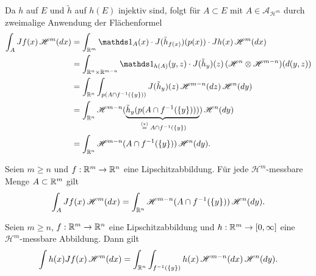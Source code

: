 \documentclass[a4paper,twoside,DIV15,BCOR12mm]{scrbook}
\newcommand{\A}{\mathcal A}
\newcommand{\ind}{\mathds 1}
\newcommand{\HM}{\mathscr H}
\begin{document}
\begin{beweis}
Da $h$ auf $E$ und $\tilde h$ auf $h(E)$ injektiv sind, folgt für $A\subset E$ mit $A\in\A_{\HM^m}$ durch zweimalige Anwendung der Flächenformel
\begin{align*}
\int_A Jf(x) \, \HM^m(dx) 
&= \int_{\MdR^m} \ind_A(x) \cdot J(\tilde h_{f(x)})(p(x)) \cdot J h(x)\, \HM^m(dx) \\
&= \int_{\MdR^n\times\MdR^{m-n}} \ind_{h(A)} (y,z) \cdot J(\tilde h_y)(z) \, (\HM^n\otimes \HM^{m-n})(d(y,z)) \\
&= \int_{\MdR^n} \int_{p(A\cap f^{-1}(\{y\}))} J(\tilde h_y)(z) \, \HM^{m-n}(dz)\, \HM^n(dy) \\
&= \int_{\MdR^n} \HM^{m-n}(\underbrace{\tilde h_y (p(A\cap f^{-1}(\{y\})))}_{\gleichwegen{(*)} A\cap f^{-1}(\{y\})}) \, \HM^n(dy) \\
&= \int_{\MdR^n} \HM^{m-n}(A\cap f^{-1}(\{y\}))\, \HM^n(dy).
\end{align*}
\end{beweis}

\begin{satz}
\label{satz:3.16}
Seien $m\ge n$ und $f:\mathbb{R}^m \to \mathbb{R}^n$ eine Lipschitzabbildung. Für jede $\HM^m$-messbare Menge $A\subset\mathbb{R}^m$ gilt 
\[
\int_A Jf(x) \,\HM^m(dx) = \int_{\MdR^n} \HM^{m-n} ( A\cap f^{-1}(\{y\})) \, \HM^n(dy).
\]
\end{satz}

\begin{korollar}
\label{kor:3.17}
Seien $m\ge n$, $f:\mathbb{R}^m \to \mathbb{R}^n$ eine Lipschitzabbildung und $h:\mathbb{R}^m\to [0,\infty]$ eine $\HM^m$-messbare Abbildung. Dann gilt
\[
\int h(x) Jf(x) \, \HM^m(dx) =
\int_{\MdR^n} \int_{f^{-1}(\{y\})} h(x) \, \HM^{m-n}(dx) \, \HM^n(dy).
\]
\end{korollar}
\end{document}
